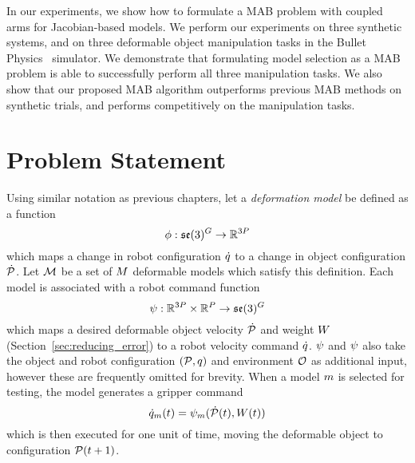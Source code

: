 In our experiments, we show how to formulate a MAB problem with coupled arms for Jacobian-based models. We perform our experiments on three synthetic systems, and on three deformable object manipulation tasks in the Bullet Physics~\cite{Coumans2010} simulator. We demonstrate that formulating model selection as a MAB problem is able to successfully perform all three manipulation tasks. We also show that our proposed MAB algorithm outperforms previous MAB methods on synthetic trials, and performs competitively on the manipulation tasks.


\section{Problem Statement}

Using similar notation as previous chapters, let a \textit{deformation model} be defined as a function 
\begin{equation}
    \phi : \mathfrak{se}(3)^G \rightarrow \mathbb{R}^{3P}
\end{equation}
which maps a change in robot configuration $\dot{q}$ to a change in object configuration $\dot{\mathcal{P}}$. Let $\mathcal{M}$ be a set of $M$ deformable models which satisfy this definition. Each model is associated with a robot command function
\begin{equation}
    \psi : \mathbb{R}^{3P} \times \mathbb{R}^P \rightarrow \mathfrak{se}(3)^G
\end{equation}
which maps a desired deformable object velocity $\dot{\mathcal{P}}$ and weight $W$ (Section~\ref{sec:reducing_error}) to a robot velocity command $\dot{q}$. $\psi$ and $\psi$ also take the object and robot configuration $(\mathcal{P}, q)$ and environment $\mathcal{O}$ as additional input, however these are frequently omitted for brevity. When a model $m$ is selected for testing, the model generates a gripper command
\begin{equation}
    \dot{q}_{m}(t) = \psi_m(\dot{\mathcal{P}}(t), W(t))
    \label{eqn:grippervel}
\end{equation}
which is then executed for one unit of time, moving the deformable object to configuration $\mathcal{P}(t+1)$.

